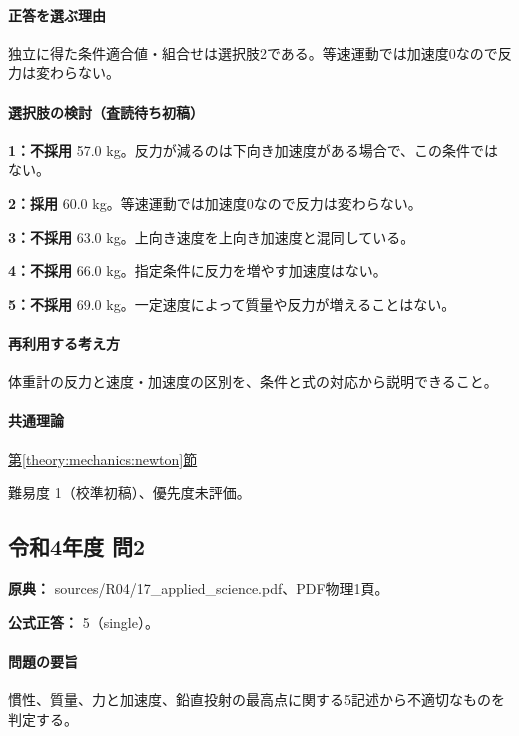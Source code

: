 \paragraph{正答を選ぶ理由} 独立に得た条件適合値・組合せは選択肢2である。等速運動では加速度0なので反力は変わらない。

\paragraph{選択肢の検討（査読待ち初稿）}

\noindent\textbf{1：不採用} 57.0 kg。反力が減るのは下向き加速度がある場合で、この条件ではない。\par

\noindent\textbf{2：採用} 60.0 kg。等速運動では加速度0なので反力は変わらない。\par

\noindent\textbf{3：不採用} 63.0 kg。上向き速度を上向き加速度と混同している。\par

\noindent\textbf{4：不採用} 66.0 kg。指定条件に反力を増やす加速度はない。\par

\noindent\textbf{5：不採用} 69.0 kg。一定速度によって質量や反力が増えることはない。\par

\paragraph{再利用する考え方} 体重計の反力と速度・加速度の区別を、条件と式の対応から説明できること。

\paragraph{共通理論} \hyperref[theory:mechanics:newton]{第\ref*{theory:mechanics:newton}節}

\par 難易度 1（校準初稿）、優先度未評価。

\subsection{令和4年度 問2}
\label{q:r04-reg-applied-02}

\noindent\textbf{原典：} sources/R04/17\_applied\_science.pdf、PDF物理1頁。

\textbf{公式正答：} 5（single）。

\paragraph{問題の要旨} 慣性、質量、力と加速度、鉛直投射の最高点に関する5記述から不適切なものを判定する。

